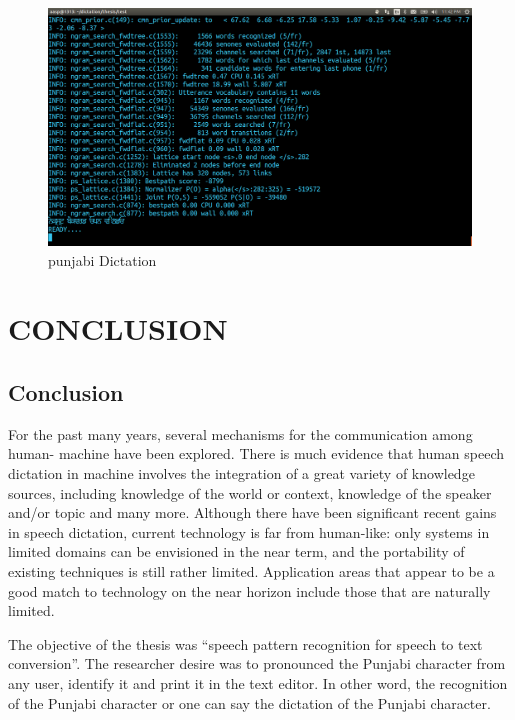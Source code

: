 \documentclass[12pt,a4paper,oneside]{memoir}
\begin{document}
\begin{figure}[h]
    \centering
    \includegraphics[scale=0.3]{Screenshot6}
    \caption{punjabi Dictation}
\end{figure}


\chapter{CONCLUSION}

\section{Conclusion}
For the past many years, several mechanisms for the communication among human-
machine have been explored. There is much evidence that human speech dictation in
machine involves the integration of a great variety of knowledge sources, including
knowledge of the world or context, knowledge of the speaker and/or topic and many
more. Although there have been significant recent gains in speech dictation, current
technology is far from human-like: only systems in limited domains can be envisioned
in the near term, and the portability of existing techniques is still rather limited.
Application areas that appear to be a good match to technology on the near horizon
include those that are naturally limited.

The objective of the thesis was “speech pattern recognition for speech to text
conversion”. The researcher desire was to pronounced the Punjabi character from any
user, identify it and print it in the text editor. In other word, the recognition of the
Punjabi character or one can say the dictation of the Punjabi character.
\end{document}
